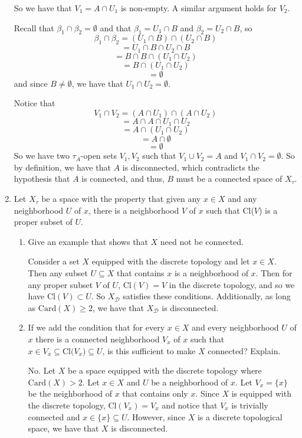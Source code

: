 \documentclass[12pt]{article}
\begin{document}
\begin{enumerate}
 So we have that $V_1 = A \cap U_1$ is non-empty. A similar argument holds for $V_2$.
 
 Recall that $\beta_1 \cap \beta_2 = \emptyset$ and that $\beta_1 = U_1 \cap B$ and $\beta_2 = U_2 \cap B$, so
 \[\beta_1 \cap \beta_2 = (U_1 \cap B) \cap (U_2 \cap B)\]
 \[ = U_1 \cap B \cap U_2 \cap B\]
 \[ = B \cap B \cap (U_1 \cap U_2)\]
 \[ = B \cap (U_1 \cap U_2)\]
 \[ = \emptyset\]
 and since $B \neq \emptyset$, we have that $U_1 \cap U_2 = \emptyset$.
 
 Notice that
 \[V_1 \cap V_2 = (A \cap U_1)  \cap (A \cap U_2)\]
 \[ = A \cap A \cap U_1 \cap U_2\]
 \[ = A \cap (U_1 \cap U_2)\]
 \[ = A \cap \emptyset\]
 \[ = \emptyset \]
 So we have two $\tau_A$-open sets $V_1, V_2$ such that $V_1 \cup V_2 = A$ and $V_1 \cap V_2 = \emptyset$. So by definition, we have that $A$ is disconnected, which contradicts the hypothesis that $A$ is connected, and thus, $B$ must be a connected space of $X_{\tau}$.
 
 
 
 
\item Let $X_{\tau}$ be a space with the property that given any $x\in X$ and any neighborhood $U$ of $x$, there is a neighborhood $V$ of $x$ such that Cl($V$) is a proper subset of $U$. 
\begin{enumerate}
\item Give an example that shows that $X$ need not be connected. 
\newline

Consider a set $X$ equipped with the discrete topology and let $x \in X$. Then any subset $U \subseteq X$ that contains $x$ is a neighborhood of $x$. Then for any proper subset $V$ of $U$, $\text{Cl}(V) = V$ in the discrete topology, and so we have $\text{Cl}(V) \subset U$. So $X_{\mathcal{D}}$ satisfies these conditions. Additionally, as long as $\text{Card}(X) \geq 2$, we have that $X_{\mathcal{D}}$ is disconnected.
\newline



\item If we add the condition that for every $x\in X$ and every neighborhood $U$ of $x$ there is a connected neighborhood $V_x$ of $x$ such that $x\in V_x\subseteq \text{Cl($V_x$)}\subseteq U$, is this sufficient to make $X$ connected? Explain.
\newline

No. Let $X$ be a space equipped with the discrete topology where $\text{Card}(X) > 2$. Let $x \in X$ and $U$ be a neighborhood of $x$. Let $V_x = \{x\}$ be the neighborhood of $x$ that contains only $x$. Since $X$ is equipped with the discrete topology, $\text{Cl}(V_x) = V_x$ and notice that $V_x$ is trivially connected and $x \in \{x\} \subseteq U$. However, since $X$ is a discrete topological space, we have that $X$ is disconnected.



\end{enumerate}
\end{enumerate}
\end{document}
